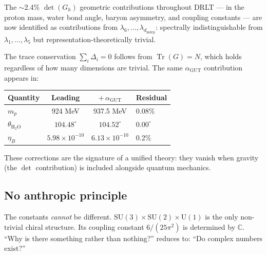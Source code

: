 \documentclass[12pt]{article}
\theoremstyle{remark}
\begin{document}
The $\sim$2.4\% $\det(G_h)$ geometric contributions throughout DRLT --- in the proton mass, water bond angle, baryon asymmetry, and coupling constants --- are now identified as contributions from $\lambda_6, \ldots, \lambda_{d_\text{indep}}$: spectrally indistinguishable from $\lambda_1, \ldots, \lambda_5$ but representation-theoretically trivial.

The trace conservation $\sum_i \Delta_i = 0$ follows from $\operatorname{Tr}(G) = N$, which holds regardless of how many dimensions are trivial. The same $\alpha_\text{GUT}$ contribution appears in:

\begin{center}
\begin{tabular}{lccl}
\hline
Quantity & Leading & $+\,\alpha_\text{GUT}$ & Residual \\
\hline
$m_p$ & 924 MeV & 937.5 MeV & 0.08\% \\
$\theta_{\text{H}_2\text{O}}$ & $104.48^\circ$ & $104.52^\circ$ & $0.00^\circ$ \\
$\eta_B$ & $5.98 \times 10^{-10}$ & $6.13 \times 10^{-10}$ & 0.2\% \\
\hline
\end{tabular}
\end{center}

These corrections are the signature of a unified theory: they vanish when gravity (the $\det$ contribution) is included alongside quantum mechanics.

\subsection{No anthropic principle}

The constants \emph{cannot} be different. $\text{SU}(3)\times\text{SU}(2)\times\text{U}(1)$ is the only non-trivial chiral structure. Its coupling constant $6/(25\pi^2)$ is determined by $\mathbb{C}$. ``Why is there something rather than nothing?'' reduces to: ``Do complex numbers exist?''
\end{document}
